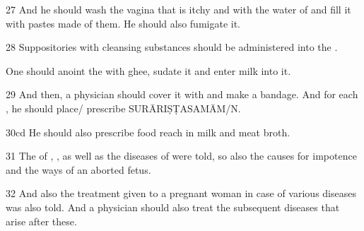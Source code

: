 \begin{translation}
\item [27]
And he should wash the vagina that is itchy and  with the water of  and fill it with pastes made of them. He should also fumigate it.

\item [28]
Suppositories with cleansing substances should be administered into the .

One should anoint the  with ghee, sudate it and enter milk into it. 

\item [29] 
And then, a physician should cover it with  and make a bandage. And for each , he should place/ prescribe SURĀRIṢṬASAMĀM/N.

\item [30cd]
He should also prescribe food reach in milk and meat broth.

\item [31]
The  of , ,  as well as the diseases of  were told, so also the causes for impotence and the ways of an aborted fetus. 

\item [32] 
And also the treatment given to a pregnant woman in case of various diseases was also told. And a physician should also treat the subsequent diseases that arise after these.  

\end{translation}
